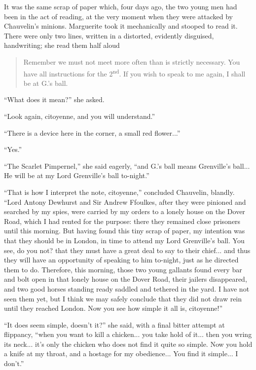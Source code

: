 It was the same scrap of paper which, four days ago, the two young men had been in the act of reading, at the very moment when they were attacked by Chauvelin's minions. Marguerite took it mechanically and stooped to read it. There were only two lines, written in a distorted, evidently disguised, handwriting; she read them half aloud\longdash


\blockquote{Remember we must not meet more often than is strictly necessary. You have all instructions for the 2\textsuperscript{nd}. If you wish to speak to me again, I shall be at G.'s ball.}

\enquote{What does it mean?} she asked.

\enquote{Look again, citoyenne, and you will understand.}

\enquote{There is a device here in the corner, a small red flower...}

\enquote{Yes.}

\enquote{The Scarlet Pimpernel,} she said eagerly, \enquote{and G.’s ball means Grenville's ball... He will be at my Lord Grenville's ball to-night.}

\enquote{That is how I interpret the note, citoyenne,} concluded Chauvelin, blandly. \enquote{Lord Antony Dewhurst and Sir Andrew Ffoulkes, after they were pinioned and searched by my spies, were carried by my orders to a lonely house on the Dover Road, which I had rented for the purpose: there they remained close prisoners until this morning. But having found this tiny scrap of paper, my intention was that they should be in London, in time to attend my Lord Grenville's ball. You see, do you not? that they must have a great deal to say to their chief... and thus they will have an opportunity of speaking to him to-night, just as he directed them to do. Therefore, this morning, those two young gallants found every bar and bolt open in that lonely house on the Dover Road, their jailers disappeared, and two good horses standing ready saddled and tethered in the yard. I have not seen them yet, but I think we may safely conclude that they did not draw rein until they reached London. Now you see how simple it all is, citoyenne!}

\enquote{It does seem simple, doesn't it?} she said, with a final bitter attempt at flippancy, \enquote{when you want to kill a chicken... you take hold of it... then you wring its neck... it's only the chicken who does not find it quite so simple. Now you hold a knife at my throat, and a hostage for my obedience... You find it simple... I don't.}

